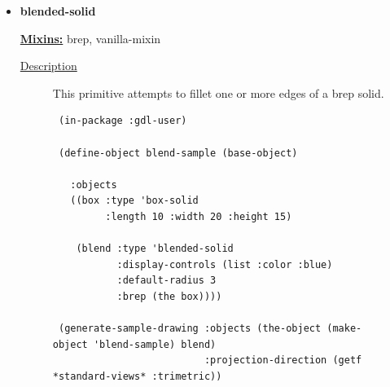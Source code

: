 \documentclass [11pt]{book}
\begin{document}
\begin{itemize}







\item {}
\label{prim:blended-solid}
\textbf{blended-solid}


\textbf{
\underline{Mixins:}} brep, vanilla-mixin





\begin{description}

\item [
\underline{Description}]


This primitive attempts to fillet one or more edges of a brep solid.



\end{description}




\begin{figure}
\begin{lrbox}{\boxedverb}
\begin{minipage}{\linewidth}
{\small

\begin{verbatim}
 (in-package :gdl-user)

 (define-object blend-sample (base-object)
   
   :objects
   ((box :type 'box-solid
         :length 10 :width 20 :height 15)
   
    (blend :type 'blended-solid
           :display-controls (list :color :blue)
           :default-radius 3
           :brep (the box))))

 (generate-sample-drawing :objects (the-object (make-object 'blend-sample) blend)
                          :projection-direction (getf *standard-views* :trimetric))



\end{verbatim}}
\end{minipage}
\end{lrbox}
\end{figure}
\end{itemize}
\end{document}
